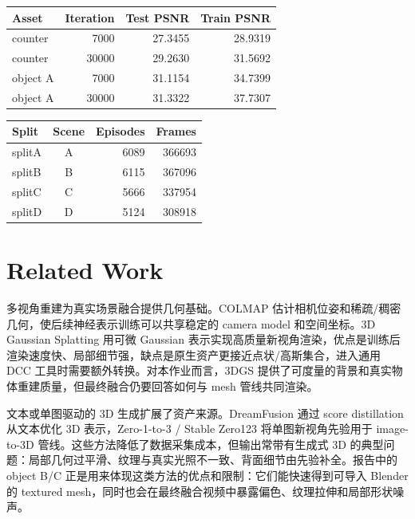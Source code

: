 \documentclass{article}
\begin{document}
	\clearpage
	\noindent
	\begin{minipage}[t]{0.48\linewidth}
		\centering
		\label{tab:topic1-psnr}
		\vspace{0.4em}
		\small
		\setlength{\tabcolsep}{3pt}
		\begin{tabular}{lrrr}
			\toprule
			Asset & Iteration & Test PSNR & Train PSNR \\
			\midrule
			counter & 7000 & 27.3455 & 28.9319 \\
			counter & 30000 & 29.2630 & 31.5692 \\
			object A & 7000 & 31.1154 & 34.7399 \\
			object A & 30000 & 31.3322 & 37.7307 \\
			\bottomrule
		\end{tabular}
	\end{minipage}
	\hfill
	\begin{minipage}[t]{0.48\linewidth}
		\centering
		\label{tab:calvin-splits}
		\vspace{0.4em}
		\begin{tabular}{lcrr}
			\toprule
			Split & Scene & Episodes & Frames \\
			\midrule
			splitA & A & 6089 & 366693 \\
			splitB & B & 6115 & 367096 \\
			splitC & C & 5666 & 337954 \\
			splitD & D & 5124 & 308918 \\
			\bottomrule
		\end{tabular}
	\end{minipage}
	\vspace{1.2em}

	\section{Related Work}

	多视角重建为真实场景融合提供几何基础。COLMAP 估计相机位姿和稀疏/稠密几何\cite{schonberger2016sfm,schonberger2016mvs}，使后续神经表示训练可以共享稳定的 camera model 和空间坐标。3D Gaussian Splatting 用可微 Gaussian 表示实现高质量新视角渲染\cite{kerbl2023gaussian}，优点是训练后渲染速度快、局部细节强，缺点是原生资产更接近点状/高斯集合，进入通用 DCC 工具时需要额外转换。对本作业而言，3DGS 提供了可度量的背景和真实物体重建质量，但最终融合仍要回答如何与 mesh 管线共同渲染。

	文本或单图驱动的 3D 生成扩展了资产来源。DreamFusion 通过 score distillation 从文本优化 3D 表示\cite{poole2022dreamfusion}，Zero-1-to-3 / Stable Zero123 将单图新视角先验用于 image-to-3D 管线\cite{liu2023zero123,stability2023zero123,threestudio2023}。这些方法降低了数据采集成本，但输出常带有生成式 3D 的典型问题：局部几何过平滑、纹理与真实光照不一致、背面细节由先验补全。报告中的 object B/C 正是用来体现这类方法的优点和限制：它们能快速得到可导入 Blender 的 textured mesh，同时也会在最终融合视频中暴露偏色、纹理拉伸和局部形状噪声。
\end{document}
